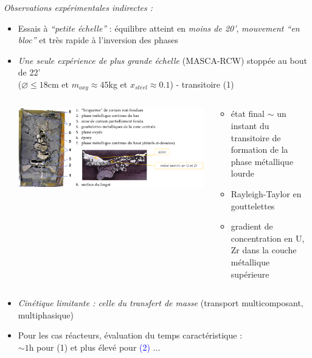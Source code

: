     \begin{frame}
    
      \emph{\small Observations expérimentales indirectes :}
      \begin{itemize}
      \item Essais à \emph{``petite échelle''} : équilibre atteint en \emph{moins de 20'}, \emph{mouvement ``en bloc''} et très rapide à l'inversion des phases
      \item \emph{Une seule expérience de plus grande échelle} (MASCA-RCW) stoppée au bout de 22' \\ ($\diameter \le 18$cm et $m_{oxy} \approx 45$kg et $x_{steel}\approx 0.1$) - transitoire \textcolor{OliveGreen}{(1)}
      \begin{columns}
\begin{column}{0.65\textwidth}
\baselineskip
\includegraphics[width=\textwidth]{Figures/rcw.png}
\end{column}
\begin{column}{0.4\textwidth}
\hskip -0.8cm \begin{minipage}{1.1\textwidth}
  \begin{itemize}
\item état final $\sim$ un instant du transitoire de formation de la phase métallique lourde
\item Rayleigh-Taylor en gouttelettes
\item gradient de concentration en U, Zr dans la couche métallique supérieure
\end{itemize}
\end{minipage}
\end{column}
      \end{columns}
      \item \emph{Cinétique limitante : celle du transfert de masse} (transport multicomposant, multiphasique)
      \item Pour les cas réacteurs, évaluation du temps caractéristique : \\ $\sim 1$h pour \textcolor{OliveGreen}{(1)} et plus élevé pour \textcolor{blue}{(2)} ...
\end{itemize}
    \end{frame}
